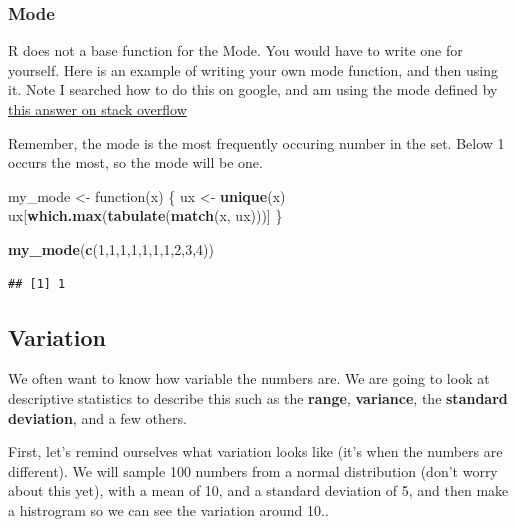 \documentclass[]{book}
\newenvironment{Shaded}{\begin{snugshade}}{\end{snugshade}}
\newcommand{\KeywordTok}[1]{\textcolor[rgb]{0.13,0.29,0.53}{\textbf{{#1}}}}
\newcommand{\DecValTok}[1]{\textcolor[rgb]{0.00,0.00,0.81}{{#1}}}
\newcommand{\StringTok}[1]{\textcolor[rgb]{0.31,0.60,0.02}{{#1}}}
\newcommand{\NormalTok}[1]{{#1}}
\theoremstyle{definition}
\theoremstyle{definition}
\theoremstyle{definition}
\theoremstyle{remark}
\begin{document}
\subsubsection{Mode}\label{mode}

R does not a base function for the Mode. You would have to write one for
yourself. Here is an example of writing your own mode function, and then
using it. Note I searched how to do this on google, and am using the
mode defined by
\href{https://stackoverflow.com/questions/2547402/is-there-a-built-in-function-for-finding-the-mode}{this
answer on stack overflow}

Remember, the mode is the most frequently occuring number in the set.
Below 1 occurs the most, so the mode will be one.

\begin{Shaded}
\begin{Highlighting}[]
\NormalTok{my_mode <-}\StringTok{ }\NormalTok{function(x) \{}
  \NormalTok{ux <-}\StringTok{ }\KeywordTok{unique}\NormalTok{(x)}
  \NormalTok{ux[}\KeywordTok{which.max}\NormalTok{(}\KeywordTok{tabulate}\NormalTok{(}\KeywordTok{match}\NormalTok{(x, ux)))]}
\NormalTok{\}}

\KeywordTok{my_mode}\NormalTok{(}\KeywordTok{c}\NormalTok{(}\DecValTok{1}\NormalTok{,}\DecValTok{1}\NormalTok{,}\DecValTok{1}\NormalTok{,}\DecValTok{1}\NormalTok{,}\DecValTok{1}\NormalTok{,}\DecValTok{1}\NormalTok{,}\DecValTok{1}\NormalTok{,}\DecValTok{2}\NormalTok{,}\DecValTok{3}\NormalTok{,}\DecValTok{4}\NormalTok{))}
\end{Highlighting}
\end{Shaded}

\begin{verbatim}
## [1] 1
\end{verbatim}

\subsection{Variation}\label{variation}

We often want to know how variable the numbers are. We are going to look
at descriptive statistics to describe this such as the \textbf{range},
\textbf{variance}, the \textbf{standard deviation}, and a few others.

First, let's remind ourselves what variation looks like (it's when the
numbers are different). We will sample 100 numbers from a normal
distribution (don't worry about this yet), with a mean of 10, and a
standard deviation of 5, and then make a histrogram so we can see the
variation around 10..
\end{document}
